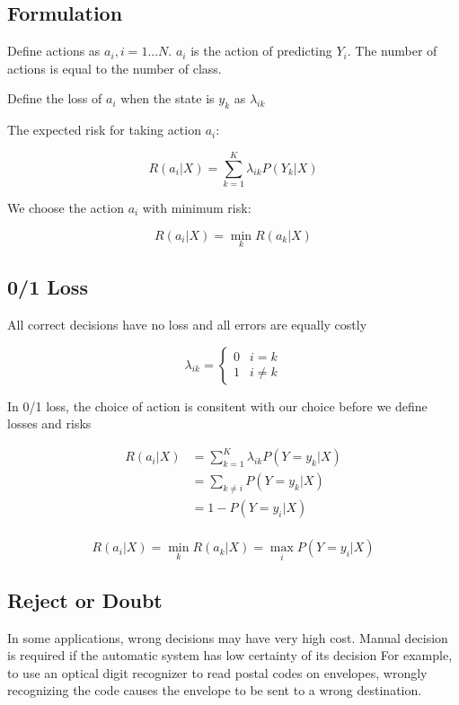 \begin{multicols*}{2}
\subsection{Formulation}

\noindent Define actions as $a_{i}, i=1...N$. $a_{i}$ is the action of predicting $Y_{i}$. The number of actions is equal to the number of class. 

\noindent Define the loss of $a_{i}$ when the state is $y_{k}$ as $\lambda_{ik}$

\noindent The expected risk for taking action $a_{i}$:

$$R(a_{i} | X) = \sum^{K}_{k=1} \lambda_{ik} P(Y_{k} | X)$$

\noindent We choose the action $a_{i}$ with minimum risk:

$$R(a_{i}|X) = \!\min_{k} R(a_{k}|X)$$

\subsection{0/1 Loss}

\noindent All correct decisions have no loss and all errors are equally costly

$$
\lambda_{ik} = 
\begin{cases}
0 & i=k\\
1 & i \ne k
\end{cases}
$$

\noindent In 0/1 loss, the choice of action is consitent with our choice before we define losses and risks

\begin{equation*}
\begin{split}
    R(a_i | X) &= \sum_{k=1}^K \lambda_{ik} P(Y=y_k|X) \\
    &= \sum_{k \ne i} P(Y=y_k | X) \\
    &= 1-P(Y=y_i|X) \\
\end{split}
\end{equation*}

$$R(a_i|X) = \!\min_{k} R(a_k|X) = \!\max_i P(Y=y_i|X)$$

\subsection{Reject or Doubt}
In some applications, wrong decisions may have very high cost. Manual decision is required if the automatic system has low certainty of its decision For example, to use an optical digit recognizer to read postal codes on envelopes, wrongly recognizing the code causes the envelope to be sent to a wrong destination.


\end{multicols*}
